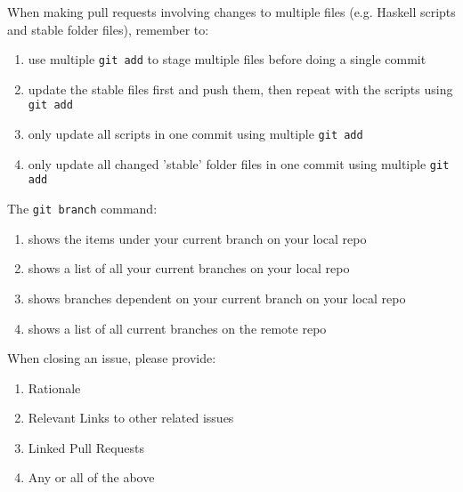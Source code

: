\documentclass[12pt,fleqn]{examtst}
\begin{document}
\newpage
\noindent
\begin{minipage}{\textwidth}

When making pull requests involving changes to multiple files (e.g. Haskell scripts and stable folder files), remember to:

\begin{enumerate}
    \item use multiple \lstinline{git add} to stage multiple files before doing a single commit
    \item update the stable files first and push them, then repeat with the scripts using \lstinline{git add}
    \item only update all scripts in one commit using multiple \lstinline{git add}
    \item only update all changed 'stable' folder files in one commit using multiple \lstinline{git add}
\end{enumerate}
\rule{0cm}{1cm}

The \lstinline{git branch} command:

\begin{enumerate}
    \item shows the items under your current branch on your local repo
    \item shows a list of all your current branches on your local repo
    \item shows branches dependent on your current branch on your local repo
    \item shows a list of all current branches on the remote repo
\end{enumerate}
\rule{0cm}{1cm}

When closing an issue, please provide:

\begin{enumerate}
    \item Rationale
    \item Relevant Links to other related issues
    \item Linked Pull Requests
    \item Any or all of the above
\end{enumerate}
\rule{0cm}{1cm}

\end{minipage}

\end{document}

